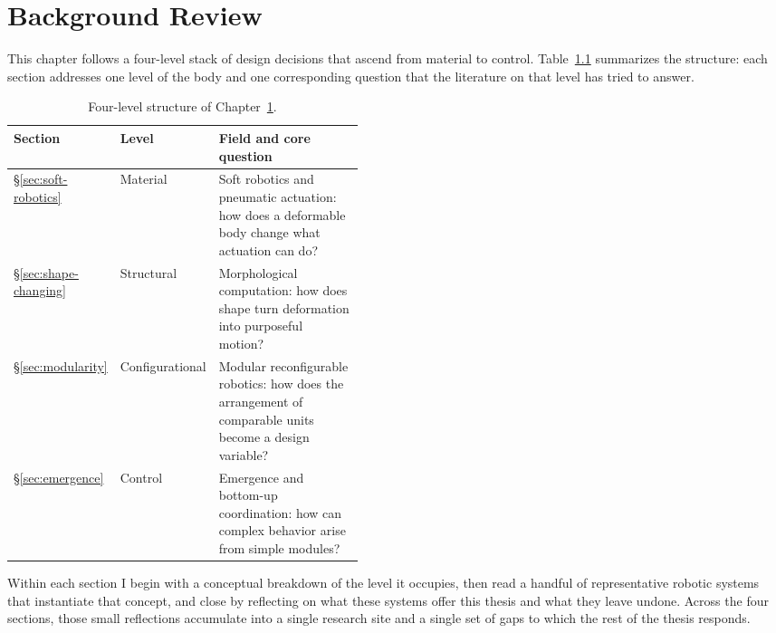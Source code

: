 \chapter{Background Review}
\label{ch:background}

This chapter follows a four-level stack of design decisions that ascend from material to control. Table~\ref{tab:ch2-overview} summarizes the structure: each section addresses one level of the body and one corresponding question that the literature on that level has tried to answer.

\begin{table}[h]
\centering
\footnotesize
\caption{Four-level structure of Chapter~\ref{ch:background}.}
\label{tab:ch2-overview}
\begin{tabular}{@{}l l p{0.45\linewidth}@{}}
\toprule
\textbf{Section} & \textbf{Level} & \textbf{Field and core question} \\
\midrule
\S\ref{sec:soft-robotics}   & Material        & Soft robotics and pneumatic actuation: how does a deformable body change what actuation can do? \\
\addlinespace
\S\ref{sec:shape-changing}  & Structural      & Morphological computation: how does shape turn deformation into purposeful motion? \\
\addlinespace
\S\ref{sec:modularity}      & Configurational & Modular reconfigurable robotics: how does the arrangement of comparable units become a design variable? \\
\addlinespace
\S\ref{sec:emergence}       & Control         & Emergence and bottom-up coordination: how can complex behavior arise from simple modules? \\
\bottomrule
\end{tabular}
\end{table}

Within each section I begin with a conceptual breakdown of the level it occupies, then read a handful of representative robotic systems that instantiate that concept, and close by reflecting on what these systems offer this thesis and what they leave undone. Across the four sections, those small reflections accumulate into a single research site and a single set of gaps to which the rest of the thesis responds.
